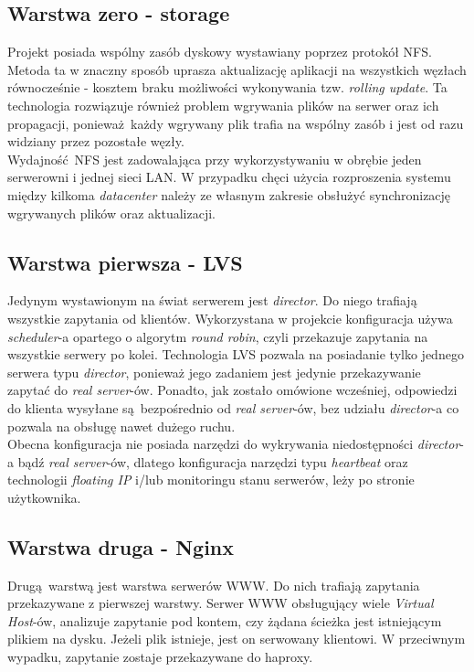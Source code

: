 \subsection{Warstwa zero - storage}
Projekt posiada wspólny zasób dyskowy wystawiany poprzez protokół NFS.
Metoda ta w znaczny sposób uprasza aktualizację aplikacji na wszystkich węzłach równocześnie - kosztem braku możliwości wykonywania tzw. \textit{rolling update}.
Ta technologia rozwiązuje również problem wgrywania plików na serwer oraz ich propagacji, ponieważ każdy wgrywany plik trafia na wspólny zasób i jest od razu widziany przez pozostałe węzły.\\
Wydajność NFS jest zadowalająca przy wykorzystywaniu w obrębie jeden serwerowni i jednej sieci LAN.
W przypadku chęci użycia rozproszenia systemu między kilkoma \textit{datacenter} należy ze własnym zakresie obsłużyć synchronizację wgrywanych plików oraz aktualizacji.
\subsection{Warstwa pierwsza - LVS}
Jedynym wystawionym na świat serwerem jest \textit{director}. Do niego trafiają wszystkie zapytania od klientów.
Wykorzystana w projekcie konfiguracja używa \textit{scheduler}-a opartego o algorytm \textit{round robin}, czyli przekazuje zapytania na wszystkie serwery po kolei.
Technologia LVS pozwala na posiadanie tylko jednego serwera typu \textit{director}, ponieważ jego zadaniem jest jedynie przekazywanie zapytać do \textit{real server}-ów.
Ponadto, jak zostało omówione wcześniej, odpowiedzi do klienta wysyłane są bezpośrednio od \textit{real server}-ów, bez udziału \textit{director}-a co pozwala na obsługę nawet dużego ruchu.\\
Obecna konfiguracja nie posiada narzędzi do wykrywania niedostępności \textit{director}-a bądź \textit{real server}-ów, dlatego konfiguracja narzędzi typu \textit{heartbeat} oraz technologii  \textit{floating IP} i/lub monitoringu stanu serwerów, leży po stronie użytkownika.
\subsection{Warstwa druga - Nginx}
Drugą warstwą jest warstwa serwerów WWW.
Do nich trafiają zapytania przekazywane z pierwszej warstwy.
Serwer WWW obsługujący wiele \textit{Virtual Host}-ów, analizuje zapytanie pod kontem, czy żądana ścieżka jest istniejącym plikiem na dysku.
Jeżeli plik istnieje, jest on serwowany klientowi.
W przeciwnym wypadku, zapytanie zostaje przekazywane do haproxy.
